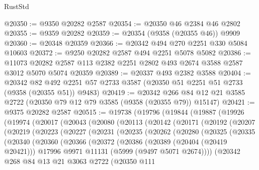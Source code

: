 \begin{lexlean}{RustStd}
\begin{coremodule}
@20350 := @9350 @20282 @2587
@20354 := @20350 @46 @2384 @46 @2802
@20355 := @9359 @20282
@20359 := @20354 (@9358 (@20355 @46)) @9909
@20360 := @20348 @20359
@20366 := @20342 @494 @270 @2251 @330 @5084 @10603
@20372 := @9250 @20282 @2587 @494 @2251 @5078 @5082
@20386 := @11073 @20282 @2587 @113 @2382 @2251 @2802 @493 @2674 @3588 @2587 @3012 @5070 @5074 @20359
@20389 := @20337 @493 @2382 @3588
@20404 := @20342
    @82
    @492
    @2251
    @57
    @2733
    @3587
    (@20350 @51 @2251 @51 @2733 (@9358 (@20355 @51)) @9483)
@20419 := @20342 @266 @84 @12 @21 @3585 @2722 (@20350 @79 @12 @79 @3585 (@9358 (@20355 @79)) @15147)
@20421 := @9375 @20282 @2587
@20515 := @19738
    (@19796
      (@19844
        (@19887
          (@19926
            (@19974
              (@20017
                (@20043
                  (@20080
                    (@20113
                      (@20142
                        (@20171
                          (@20192
                            (@20207
                              (@20219
                                (@20223
                                  (@20227
                                    (@20231
                                      (@20235
                                        (@20262
                                          (@20280
                                            (@20325
                                              (@20335
                                                (@20340
                                                  (@20360
                                                    (@20366
                                                      (@20372
                                                        (@20386
                                                          (@20389 (@20404 (@20419 @20421)))
                                                          @17996
                                                          @9971
                                                          @11131
                                                          (@5999 (@9497 @5071 @2674))))
                                                      (@20342
                                                        @268
                                                        @84
                                                        @13
                                                        @21
                                                        @3063
                                                        @2722
                                                        (@20350
                                                          @111

\end{coremodule}
\end{lexlean}
